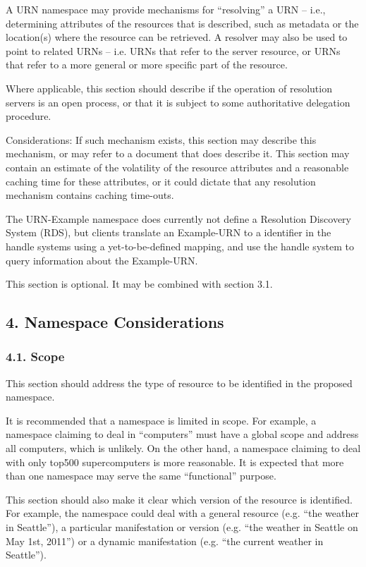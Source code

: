 \documentclass[12pt]{article}  %
\begin{document}
A URN namespace may provide mechanisms for “resolving” a URN -- 
i.e., determining attributes of the resources that is described, 
such as metadata or the location(s) where the resource can be retrieved.
A resolver may also be used to point to related URNs -- i.e. URNs that 
refer to the server resource, or URNs that refer to a more general or 
more specific part of the resource.

Where applicable, this section should describe if the operation of resolution 
servers is an open process, or that it is subject to some authoritative 
delegation procedure.

Considerations: If such mechanism exists, this section may describe this 
mechanism, or may refer to a document that does describe it.
This section may contain an estimate of the volatility of the resource 
attributes and a reasonable caching time for these attributes, or it could 
dictate that any resolution mechanism contains caching time-outs.

\begin{example}
The URN-Example namespace does currently not define a Resolution Discovery 
System (RDS), but clients \MAY{} translate an Example-URN to a identifier in 
the handle systems\cite{rfc3650} using a yet-to-be-defined mapping, and use 
the handle system to query information about the Example-URN.
\end{example}

This section is optional. It may be combined with section 3.1.

\subsection*{4. Namespace Considerations}

\subsubsection*{4.1. Scope}

This section should address the type of resource to be identified in 
the proposed namespace.

It is recommended that a namespace is limited in scope.  
For example, a namespace claiming to deal in “computers” must 
have a global scope and address all computers, which is unlikely.
On the other hand, a namespace claiming to deal with only top500 
supercomputers is more reasonable. It is expected that more than one 
namespace may serve the same “functional” purpose.

This section should also make it clear which version of the resource is 
identified. For example, the namespace could deal with a general
resource (e.g. “the weather in Seattle”), a particular manifestation or
version (e.g. “the weather in Seattle on May 1st, 2011”) or a dynamic
manifestation (e.g. “the current weather in Seattle”).
\end{document}
